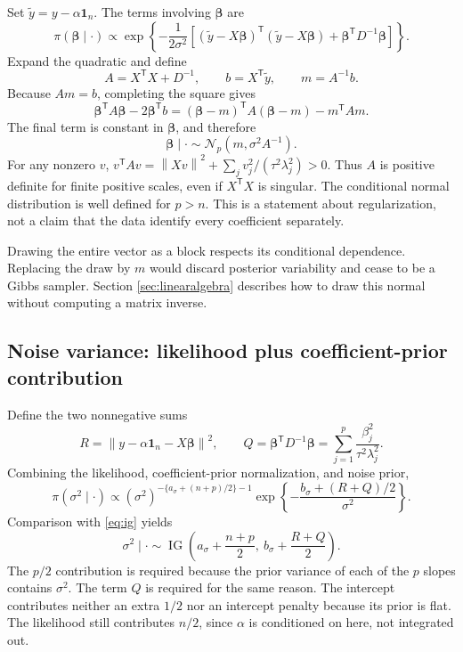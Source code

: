 \documentclass[11pt,letterpaper]{article}
\numberwithin{equation}{section}
\newcommand{\IG}{\operatorname{IG}}
\newcommand{\Normal}{\mathcal{N}}
\newcommand{\given}{\mid}
\newcommand{\bbeta}{\bm{\beta}}
\newcommand{\ones}{\mathbf{1}}
\newcommand{\trans}{^{\mathsf T}}
\newcommand{\norm}[1]{\left\lVert#1\right\rVert}
\begin{document}
Set \(\widetilde y=y-\alpha\ones_n\). The terms involving \(\bbeta\) are
\[
 \pi(\bbeta\given\cdot)\propto
 \exp\left\{-\frac{1}{2\sigma^2}
   \left[(\widetilde y-X\bbeta)\trans(\widetilde y-X\bbeta)
          +\bbeta\trans D^{-1}\bbeta\right]\right\}.
\]
Expand the quadratic and define
\begin{equation}\label{eq:A}
 A=X\trans X+D^{-1},\qquad b=X\trans\widetilde y,\qquad m=A^{-1}b.
\end{equation}
Because \(Am=b\), completing the square gives
\[
 \bbeta\trans A\bbeta-2\bbeta\trans b
 =(\bbeta-m)\trans A(\bbeta-m)-m\trans Am.
\]
The final term is constant in \(\bbeta\), and therefore
\begin{equation}\label{eq:beta}
 \boxed{\bbeta\given\cdot\sim\Normal_p(m,\sigma^2 A^{-1}).}
\end{equation}
For any nonzero \(v\),
\(v\trans Av=\norm{Xv}^2+\sum_jv_j^2/(\tau^2\lambda_j^2)>0\).
Thus \(A\) is positive definite for finite positive scales, even if
\(X\trans X\) is singular. The conditional normal distribution is well
defined for \(p>n\). This is a statement about regularization, not a claim
that the data identify every coefficient separately.

Drawing the entire vector as a block respects its conditional dependence.
Replacing the draw by \(m\) would discard posterior variability and cease to
be a Gibbs sampler. Section \ref{sec:linearalgebra} describes how to draw this
normal without computing a matrix inverse.

\subsection{Noise variance: likelihood plus coefficient-prior contribution}

Define the two nonnegative sums
\begin{equation}\label{eq:RSSQ}
 R=\norm{y-\alpha\ones_n-X\bbeta}^2,\qquad
 Q=\bbeta\trans D^{-1}\bbeta
   =\sum_{j=1}^p\frac{\beta_j^2}{\tau^2\lambda_j^2}.
\end{equation}
Combining the likelihood, coefficient-prior normalization, and noise prior,
\[
 \pi(\sigma^2\given\cdot)\propto
 (\sigma^2)^{-\{a_\sigma+(n+p)/2\}-1}
 \exp\left\{-\frac{b_\sigma+(R+Q)/2}{\sigma^2}\right\}.
\]
Comparison with \eqref{eq:ig} yields
\begin{equation}\label{eq:sigma}
 \boxed{\sigma^2\given\cdot\sim
 \IG\left(a_\sigma+\frac{n+p}{2},\ b_\sigma+\frac{R+Q}{2}\right).}
\end{equation}
The \(p/2\) contribution is required because the prior variance of each of
the \(p\) slopes contains \(\sigma^2\). The term \(Q\) is required for the
same reason. The intercept contributes neither an extra \(1/2\) nor an
intercept penalty because its prior is flat. The likelihood still contributes
\(n/2\), since \(\alpha\) is conditioned on here, not integrated out.
\end{document}
